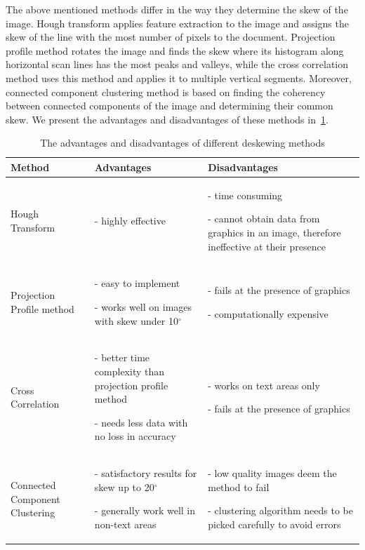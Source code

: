 The above mentioned methods differ in the way they determine the skew of the image. Hough transform applies feature extraction to the image and assigns the skew of the line with the most number of pixels to the document. Projection profile method rotates the image and finds the skew where its histogram along horizontal scan lines has the most peaks and valleys, while the cross correlation method uses this method and applies it to multiple vertical segments. Moreover, connected component clustering method is based on finding the coherency between connected components of the image and determining their common skew. We present the advantages and disadvantages of these methods in~\cref{tab:preprocessSkewProsCons}.

\begin{table}[t]
{\small
\begin{tabular}{p{5em}p{13em}p{13em}}
\toprule
\textbf{Method} & \textbf{Advantages} & \textbf{Disadvantages} \\
\midrule
Hough Transform
&
- highly effective
&
- time consuming

- cannot obtain data from graphics in an image, therefore ineffective at their presence

\\
Projection Profile method
&
- easy to implement

- works well on images with skew under 10$^{\circ}$
&

- fails at the presence of graphics

- computationally expensive

\\
Cross Correlation
&

- better time complexity than projection profile method

- needs less data with no loss in accuracy

&

- works on text areas only

- fails at the presence of graphics

\\
Connected Component Clustering
&

- satisfactory results for skew up to 20$^{\circ}$

- generally work well in non-text areas

&

- low quality images deem the method to fail

- clustering algorithm needs to be picked carefully to avoid errors

\\
\bottomrule
\end{tabular}
}
\caption{The advantages and disadvantages of different deskewing methods}
\label{tab:preprocessSkewProsCons}
\end{table}

